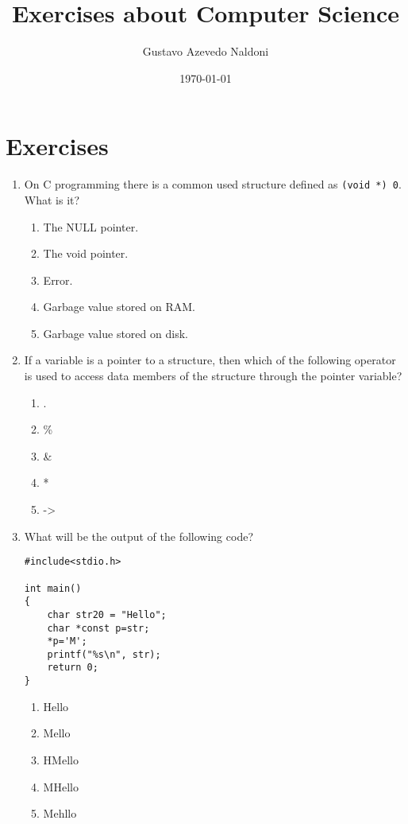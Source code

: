 \documentclass{article}
\title{Exercises about Computer Science}
\author{Gustavo Azevedo Naldoni}
\date{\today}
\begin{document}

\maketitle
\section{Exercises}
\begin{enumerate}
\item On C programming there is a common used structure defined as \texttt{(void *) 0}. What is it?
    
            \begin{enumerate}
                \item The NULL pointer.
                \item The void pointer.
                \item Error.
                \item Garbage value stored on RAM.
                \item Garbage value stored on disk.
            \end{enumerate}
\item If a variable is a pointer to a structure, then which of the following operator is used to access data members of the structure through the pointer variable?
    
            \begin{enumerate}
                \item .
                \item \%
                \item \&
                \item *
                \item ->
            \end{enumerate}
\item What will be the output of the following code?

            \begin{verbatim}
#include<stdio.h>

int main()
{
    char str20 = "Hello";
    char *const p=str;
    *p='M';
    printf("%s\n", str);
    return 0;
}
            \end{verbatim}
    
            \begin{enumerate}
                \item Hello
                \item Mello
                \item HMello
                \item MHello
                \item Mehllo
            \end{enumerate}


\end{enumerate}
\end{document}
